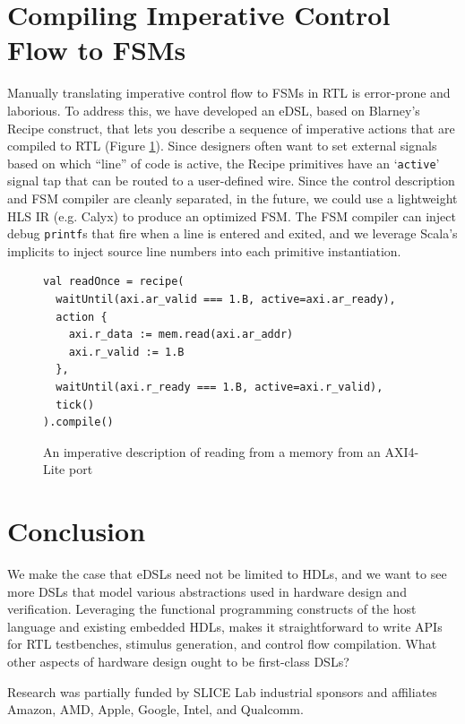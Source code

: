 \documentclass[sigplan,review,nonacm,9pt]{acmart}
\begin{document}
\section{Compiling Imperative Control Flow to FSMs}

Manually translating imperative control flow to FSMs in RTL is error-prone and laborious.
To address this, we have developed an eDSL\cite{chisel_recipes}, based on Blarney's Recipe construct\cite{blarney}, that lets you describe a sequence of imperative actions that are compiled to RTL (Figure \ref{fig:recipes}).
Since designers often want to set external signals based on which ``line'' of code is active, the Recipe primitives have an `\texttt{active}' signal tap that can be routed to a user-defined wire.
Since the control description and FSM compiler are cleanly separated, in the future, we could use a lightweight HLS IR (e.g. Calyx\cite{calyx}) to produce an optimized FSM.
The FSM compiler can inject debug \texttt{printf}s that fire when a line is entered and exited, and we leverage Scala's implicits\cite{sourcecode} to inject source line numbers into each primitive instantiation.

\begin{figure}
\begin{verbatim}
val readOnce = recipe(
  waitUntil(axi.ar_valid === 1.B, active=axi.ar_ready),
  action {
    axi.r_data := mem.read(axi.ar_addr)
    axi.r_valid := 1.B
  },
  waitUntil(axi.r_ready === 1.B, active=axi.r_valid),
  tick()
).compile()
\end{verbatim}
\caption{An imperative description of reading from a memory from an AXI4-Lite port}
\label{fig:recipes}
\end{figure}

\section{Conclusion}


We make the case that eDSLs need not be limited to HDLs, and we want to see more DSLs that model various abstractions used in hardware design and verification.
Leveraging the functional programming constructs of the host language and existing embedded HDLs, makes it straightforward to write APIs for RTL testbenches, stimulus generation, and control flow compilation.
What other aspects of hardware design ought to be first-class DSLs?

\begin{acks}
Research was partially funded by SLICE Lab industrial sponsors and affiliates Amazon, AMD, Apple, Google, Intel, and Qualcomm.
\end{acks}




\end{document}

